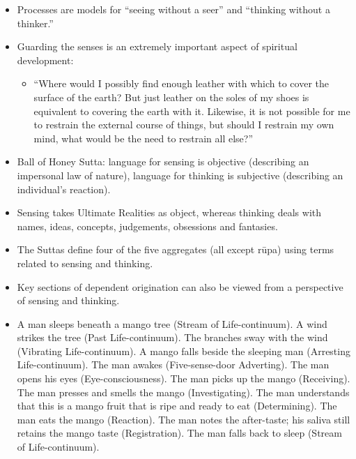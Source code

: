 \begin{itemize}

\item Processes are models for “seeing without a seer” and “thinking without a thinker.”

\item Guarding the senses is an extremely important aspect of spiritual development:

\begin{itemize}

\item “Where would I possibly find enough leather with which to cover the surface of the earth? But just leather on the soles of my shoes is equivalent to covering the earth with it. Likewise, it is not possible for me to restrain the external course of things, but should I restrain my own mind, what would be the need to restrain all else?”

\end{itemize}

\item Ball of Honey Sutta: language for sensing is objective (describing an impersonal law of nature), language for thinking is subjective (describing an individual’s reaction).

\item Sensing takes Ultimate Realities as object, whereas thinking deals with names, ideas, concepts, judgements, obsessions and fantasies.

\item The Suttas define four of the five aggregates (all except rūpa) using terms related to sensing and thinking.

\item Key sections of dependent origination can also be viewed from a perspective of sensing and thinking.

\item A man sleeps beneath a mango tree (Stream of Life-continuum). A wind strikes the tree (Past Life-continuum). The branches sway with the wind (Vibrating Life-continuum). A mango falls beside the sleeping man (Arresting Life-continuum). The man awakes (Five-sense-door Adverting). The man opens his eyes (Eye-consciousness). The man picks up the mango (Receiving). The man presses and smells the mango (Investigating). The man understands that this is a mango fruit that is ripe and ready to eat (Determining). The man eats the mango (Reaction). The man notes the after-taste; his saliva still retains the mango taste (Registration). The man falls back to sleep (Stream of Life-continuum).


\end{itemize}
